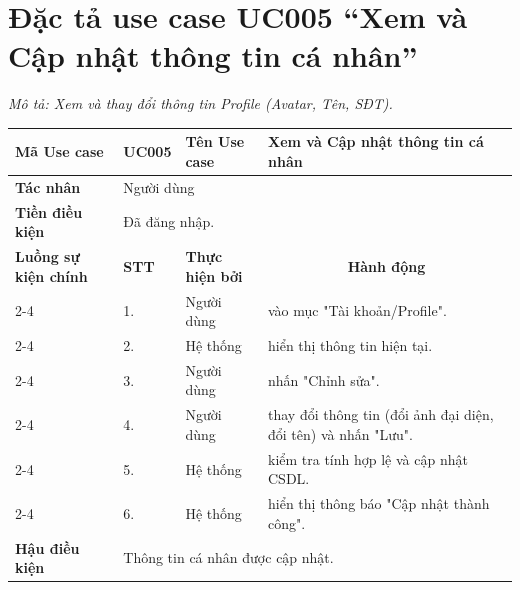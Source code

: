 \section{Đặc tả use case UC005 ``Xem và Cập nhật thông tin cá nhân''}
\textit{Mô tả: Xem và thay đổi thông tin Profile (Avatar, Tên, SĐT).}
\vspace{0.5cm}

\begingroup
\renewcommand{\arraystretch}{1.5}

\begin{longtable}{|p{2.7cm}|p{0.8cm}|p{2.6cm}|p{7.3cm}|}
\hline
\cellcolor[HTML]{D5F5E3}\textbf{Mã Use case} & \multicolumn{1}{l|}{UC005} & \cellcolor[HTML]{D5F5E3}\textbf{Tên Use case} & Xem và Cập nhật thông tin cá nhân \\ \hline
\cellcolor[HTML]{D5F5E3}\textbf{Tác nhân} & \multicolumn{3}{p{10.7cm}|}{Người dùng} \\ \hline
\cellcolor[HTML]{D5F5E3}\textbf{Tiền điều kiện} & \multicolumn{3}{p{10.7cm}|}{Đã đăng nhập.} \\ \hline

\cellcolor[HTML]{D5F5E3}\textbf{Luồng sự kiện chính} & \cellcolor[HTML]{FDEBD0}\textbf{STT} & \cellcolor[HTML]{FDEBD0}\textbf{Thực hiện bởi} & \multicolumn{1}{c|}{\cellcolor[HTML]{FDEBD0}\textbf{Hành động}} \\ \cline{2-4} 
\cellcolor[HTML]{D5F5E3} & 1. & Người dùng & vào mục "Tài khoản/Profile". \\ \cline{2-4} 
\cellcolor[HTML]{D5F5E3} & 2. & Hệ thống & hiển thị thông tin hiện tại. \\ \cline{2-4} 
\cellcolor[HTML]{D5F5E3} & 3. & Người dùng & nhấn "Chỉnh sửa". \\ \cline{2-4} 
\cellcolor[HTML]{D5F5E3} & 4. & Người dùng & thay đổi thông tin (đổi ảnh đại diện, đổi tên) và nhấn "Lưu". \\ \cline{2-4} 
\cellcolor[HTML]{D5F5E3} & 5. & Hệ thống & kiểm tra tính hợp lệ và cập nhật CSDL. \\ \cline{2-4} 
\cellcolor[HTML]{D5F5E3} & 6. & Hệ thống & hiển thị thông báo "Cập nhật thành công". \\ \hline

\cellcolor[HTML]{D5F5E3}\textbf{Hậu điều kiện} & \multicolumn{3}{p{10.7cm}|}{Thông tin cá nhân được cập nhật.} \\ \hline
\end{longtable}
\endgroup

